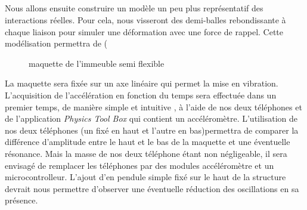 \documentclass[a4paper]{article}
\begin{document}
 
 
 
 
 
 \subparagraph{}Nous allons ensuite construire un modèle un peu plus représentatif des interactions réelles. Pour cela, nous visseront des demi-balles rebondissante à chaque liaison pour simuler une déformation avec une force de rappel. Cette modélisation permettra de (
\begin{figure}[h]
 \caption {maquette de l'immeuble semi flexible}
\end{figure}
La maquette sera fixée sur un axe linéaire qui permet la mise en vibration. 
L'acquisition de l'accélération en fonction du temps sera effectuée dans un premier temps, de manière simple et intuitive , à l'aide de nos deux téléphones et de l'application \textit{Physics Tool Box} qui contient un accéléromètre. L'utilisation de nos deux téléphones (un fixé en haut et l'autre en bas)permettra de comparer la différence d'amplitude entre le haut et le bas de la maquette et une éventuelle résonance. Mais la masse de nos deux téléphone étant non négligeable, il sera envisagé de remplacer les téléphones par des modules accéléromètre et un microcontrolleur.
L'ajout d'en pendule simple fixé sur le haut de la structure devrait nous permettre d'observer une éventuelle réduction des oscillations en sa présence. 
 
\end{document}

